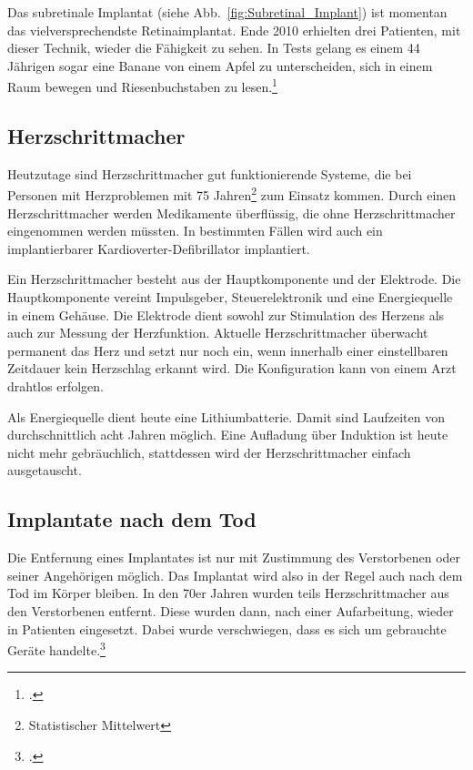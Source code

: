 Das subretinale Implantat (siehe Abb.~\vref{fig:Subretinal_Implant}) ist momentan das
vielversprechendste Retinaimplantat. Ende 2010 erhielten
drei Patienten, mit dieser Technik, wieder die Fähigkeit zu sehen. In Tests gelang es einem 44
Jährigen sogar eine Banane von einem Apfel zu unterscheiden, sich in einem Raum bewegen und
Riesenbuchstaben zu lesen.\footcite{Independent:retina_chip}

\subsection{Herzschrittmacher}
\label{sec:Robin:topical:Pacemaker}
Heutzutage sind Herzschrittmacher gut funktionierende Systeme, die bei Personen mit Herzproblemen mit
75 Jahren\footnote{Statistischer Mittelwert} zum Einsatz kommen. Durch einen Herzschrittmacher werden
Medikamente überflüssig, die ohne Herzschrittmacher eingenommen werden müssten.
In bestimmten Fällen wird auch ein implantierbarer Kardioverter-Defibrillator implantiert.

Ein Herzschrittmacher besteht aus der Hauptkomponente und der Elektrode. Die Hauptkomponente vereint
Impulsgeber, Steuerelektronik und eine Energiequelle in einem Gehäuse. Die Elektrode dient sowohl zur
Stimulation des Herzens als auch zur Messung der Herzfunktion. Aktuelle Herzschrittmacher überwacht
permanent das Herz und setzt nur noch ein, wenn innerhalb einer einstellbaren Zeitdauer kein
Herzschlag erkannt wird. Die Konfiguration kann von einem Arzt drahtlos erfolgen.

Als Energiequelle dient heute eine Lithiumbatterie. Damit sind Laufzeiten von durchschnittlich acht
Jahren möglich. Eine Aufladung über Induktion ist heute nicht mehr gebräuchlich, stattdessen wird der
Herzschrittmacher einfach ausgetauscht.

\subsection{Implantate nach dem Tod}
Die Entfernung eines Implantates ist nur mit Zustimmung des Verstorbenen oder seiner Angehörigen
möglich. Das Implantat wird also in der Regel auch nach dem Tod im Körper bleiben. In den 70er Jahren
wurden teils Herzschrittmacher aus den Verstorbenen entfernt. Diese wurden dann, nach einer
Aufarbeitung, wieder in Patienten eingesetzt. Dabei wurde verschwiegen, dass es sich um gebrauchte
Geräte handelte.\footcite{Spiegel:Herzschrittmacher-Prozess}
